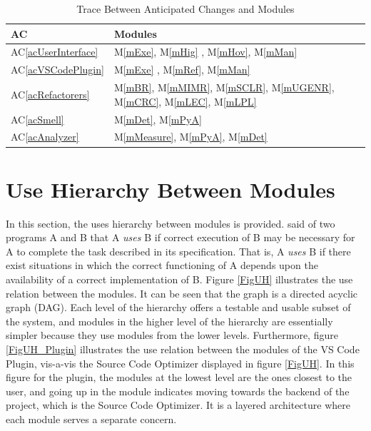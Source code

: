 \documentclass[12pt, titlepage]{article}
\newcommand{\acref}[1]{AC\ref{#1}}
\newcommand{\mref}[1]{M\ref{#1}}
\begin{document}
\begin{table}[H]
  \centering
  \begin{tabular}{p{} p{}}
  \toprule
  \textbf{AC} & \textbf{Modules}\\
  \midrule
  \acref{acUserInterface} & \mref{mExe}, \mref{mHig} , \mref{mHov}, \mref{mMan} \\
  \acref{acVSCodePlugin} & \mref{mExe} , \mref{mRef}, \mref{mMan} \\
  \acref{acRefactorers} & \mref{mBR}, \mref{mMIMR}, \mref{mSCLR}, \mref{mUGENR}, \mref{mCRC}, \mref{mLEC}, \mref{mLPL} \\
  \acref{acSmell} & \mref{mDet}, \mref{mPyA} \\
  \acref{acAnalyzer} & \mref{mMeasure}, \mref{mPyA}, \mref{mDet} \\
  \bottomrule
  \end{tabular}
  \caption{Trace Between Anticipated Changes and Modules}
  \label{TblACT}
\end{table}

\section{Use Hierarchy Between Modules} \label{SecUse}

In this section, the uses hierarchy between modules is
provided. \citet{Parnas1978} said of two programs A and B that A {\em uses} B if
correct execution of B may be necessary for A to complete the task described in
its specification. That is, A {\em uses} B if there exist situations in which
the correct functioning of A depends upon the availability of a correct
implementation of B.  Figure \ref{FigUH} illustrates the use relation between
the modules. It can be seen that the graph is a directed acyclic graph
(DAG). Each level of the hierarchy offers a testable and usable subset of the
system, and modules in the higher level of the hierarchy are essentially simpler
because they use modules from the lower levels. Furthermore, figure \ref{FigUH_Plugin} 
illustrates the use relation between the modules of the VS Code Plugin, vis-a-vis the Source Code 
Optimizer displayed in  figure \ref{FigUH}. In this figure for the plugin, the modules at the lowest 
level are the ones closest to the user, and going up in the module indicates moving towards
the backend of the project, which is the Source Code Optimizer. It is a layered architecture
where each module serves a separate concern.

\end{document}
